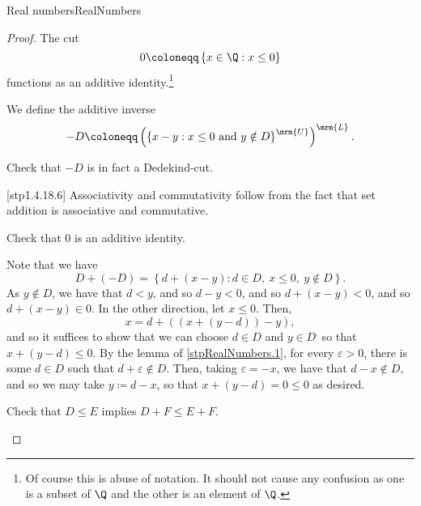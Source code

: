\begin{thm}{Real numbers}{RealNumbers}
\begin{proof}
The cut
\begin{equation}
0\coloneqq \left\{ x\in \Q :x\leq 0\right\}
\end{equation}
functions as an additive identity.\footnote{Of course this is abuse of notation.  It should not cause any confusion as one is a subset of $\Q$ and the other is an element of $\Q$.}

We define the additive inverse
\begin{equation}
-D\coloneqq \left( \left\{ x-y:x\leq 0\text{ and }y\notin D\right\} ^{\mrm{U}}\right) ^{\mrm{L}}.
\end{equation}
\begin{exr}[breakable=false]{}{}
Check that $-D$ is in fact a Dedekind-cut.
\end{exr}

[stp1.4.18.6]
Associativity and commutativity follow from the fact that set addition is associative and commutative.
\begin{exr}[breakable=false]{}{}
Check that $0$ is an additive identity.
\end{exr}
Note that we have
\begin{equation}
D+(-D)=\left\{ d+(x-y):d\in D,\ x\leq 0,\ y\notin D\right\} .
\end{equation}
As $y\notin D$, we have that $d<y$, and so $d-y<0$, and so $d+(x-y)<0$, and so $d+(x-y)\in 0$.  In the other direction, let $x\leq 0$.  Then,
\begin{equation}
x=d+\left( \left( x+(y-d)\right) -y\right) ,
\end{equation}
and so it suffices to show that we can choose $d\in D$ and $y\in D^{\comp}$ so that $x+(y-d)\leq 0$.  By the lemma of \cref{stpRealNumbers.1}, for every $\varepsilon >0$, there is some $d\in D$ such that $d+\varepsilon \notin D$.  Then, taking $\varepsilon =-x$, we have that $d-x\notin D$, and so we may take $y\coloneqq d-x$, so that $x+(y-d)=0\leq 0$ as desired.

\begin{exr}[breakable=false]{}{}
Check that $D\leq E$ implies $D+F\leq E+F$.
\end{exr}


\end{proof}
\end{thm}
